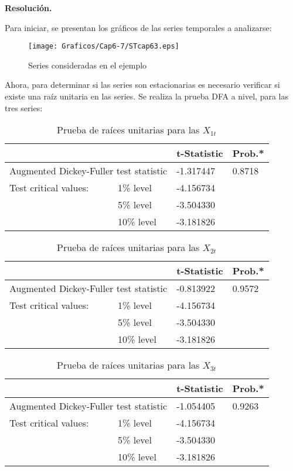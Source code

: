 \textbf{Resoluci\'{o}n.}\newline

Para iniciar, se presentan los gr\'{a}ficos de las series temporales a analizarse:

\begin{figure}[H]
\centering
\texttt{[image: Graficos/Cap6-7/STcap63.eps]}
\caption{Series consideradas en el ejemplo}
\end{figure}

Ahora, para determinar si las series son estacionarias es necesario verificar si existe una ra\'{i}z unitaria en las series. Se realiza la prueba DFA a nivel, para las tres series:

\begin{table}[H]
\centering
\begin{tabular}{p{120pt}p{60pt}p{50pt}l} \hline \hline
& & t-Statistic & Prob.* \\ \hline \hline
\multicolumn{2}{p{180pt}}{Augmented Dickey-Fuller test statistic} & -1.317447 & 0.8718 \\ \hline
Test critical values: & 1{\%} level & -4.156734 & \\ 
 & 5{\%} level & -3.504330 & \\ 
 & 10{\%} level & -3.181826 & \\ \hline \hline
\end{tabular}
\caption{Prueba de ra\'{i}ces unitarias para las $X_{1t}$}
\end{table}

\begin{table}[H]
\centering
\begin{tabular}{p{120pt}p{60pt}p{50pt}l} \hline \hline
& & t-Statistic & Prob.* \\ \hline \hline
\multicolumn{2}{p{180pt}}{Augmented Dickey-Fuller test statistic} & -0.813922 & 0.9572 \\ \hline
Test critical values: & 1{\%} level & -4.156734 & \\ 
 & 5{\%} level & -3.504330 & \\ 
 & 10{\%} level & -3.181826 & \\ \hline \hline
\end{tabular}
\caption{Prueba de ra\'{i}ces unitarias para las $X_{2t}$}
\end{table}

\begin{table}[H]
\centering
\begin{tabular}{p{120pt}p{60pt}p{50pt}l} \hline \hline
& & t-Statistic & Prob.* \\ \hline \hline
\multicolumn{2}{p{180pt}}{Augmented Dickey-Fuller test statistic} & -1.054405 & 0.9263 \\ \hline
Test critical values: & 1{\%} level & -4.156734 & \\ 
 & 5{\%} level & -3.504330 & \\ 
 & 10{\%} level & -3.181826 & \\ \hline \hline
\end{tabular}
\caption{Prueba de ra\'{i}ces unitarias para las $X_{3t}$}
\end{table}

